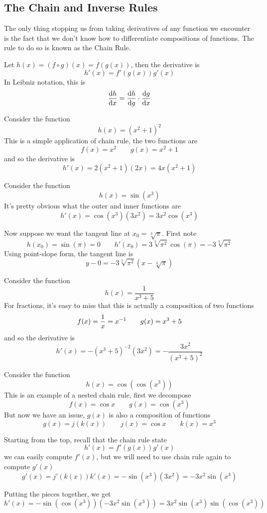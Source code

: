 \newpage
\subsection{The Chain and Inverse Rules}
The only thing stopping us from taking derivatives of any function we encounter is the fact that we don't know how to differentiate compositions of functions. The rule to do so is known as the Chain Rule.

\begin{theorem}
	Let $h(x) = (f \circ g)(x) = f(g(x))$, then the derivative is 
	\[ h'(x) = f'(g(x)) g'(x) \]
	In Leibniz notation, this is
	\[ \dv{h}{x} = \dv{h}{g} \cdot \dv{g}{x} \]
\end{theorem}

\begin{example}
	Consider the function
	\[ h(x) = (x^2 + 1)^2 \]
	This is a simple application of chain rule, the two functions are
	\[ f(x) = x^2 \qquad g(x) = x^2 + 1 \]
	and so the derivative is 
	\[ h'(x) = 2(x^2 + 1)(2x) = 4x(x^2 + 1) \]
\end{example}

\begin{example}
	Consider the function
	\[ h(x) = \sin(x^3) \]
	It's pretty obvious what the outer and inner functions are
	\[ h'(x) = \cos(x^3)(3x^2) = 3x^2 \cos(x^3) \]
	
	Now suppose we want the tangent line at $x_0 = \sqrt[3]{\pi}$. First note
	\[ h(x_0) = \sin(\pi) = 0 \qquad h'(x_0) = 3\sqrt[3]{\pi^2}\cos(\pi) = -3\sqrt[3]{\pi^2} \]
	Using point-slope form, the tangent line is
	\[ y - 0 = -3\sqrt[3]{\pi^2}(x - \sqrt[3]{\pi}) \]
\end{example}

\begin{example}
	Consider the function
	\[ h(x) = \frac{1}{x^3 + 5} \]
	For fractions, it's easy to miss that this is actually a composition of two functions
	\[ f(x) = \frac{1}{x} = {x}^{-1} \qquad g(x) = x^3 + 5 \]
	and so the derivative is
	\[ h'(x) = -(x^3 + 5)^{-2}(3x^2) = -\frac{3x^2}{(x^3 + 5)^2}\]
\end{example}

\begin{example}
	Consider the function
	\[ h(x) = \cos(\cos(x^3)) \]
	This is an example of a nested chain rule, first we decompose
	\[ f(x) = \cos x \qquad g(x) = \cos(x^3) \]
	But now we have an issue, $g(x)$ is also a composition of functions
	\[ g(x) = j(k(x)) \qquad j(x) = \cos x \qquad k(x) = x^3 \]
	
	Starting from the top, recall that the chain rule state
	\[ h'(x) = f'(g(x)) g'(x) \]
	we can easily compute $f'(x)$, but we will need to use chain rule again to compute $g'(x)$
	\[ g'(x) = j'(k(x)) k'(x) = -\sin(x^3) (3x^2) = -3x^2 \sin(x^3) \]
	
	Putting the pieces together, we get
	\[ h'(x) = -\sin( \cos(x^3)) (-3x^2 \sin(x^3)) = 3x^2 \sin(x^3) \sin(\cos(x^3)) \]
\end{example}

